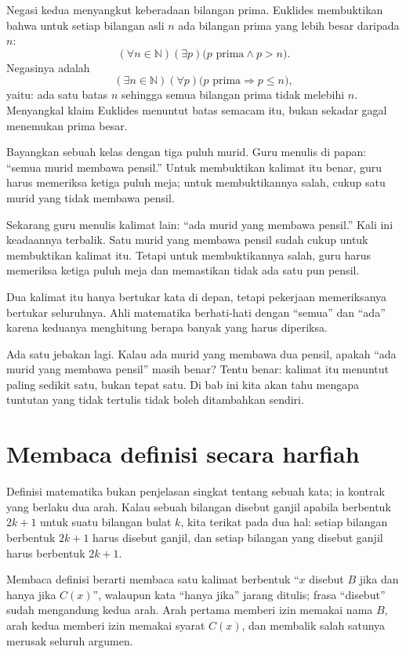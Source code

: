 Negasi kedua menyangkut keberadaan bilangan prima. Euklides membuktikan bahwa untuk
setiap bilangan asli $n$ ada bilangan prima yang lebih besar daripada $n$:
\[
  (\forall n \in \mathbb{N})(\exists p)\bigl(p \text{ prima} \wedge p > n\bigr).
\]
Negasinya adalah
\[
  (\exists n \in \mathbb{N})(\forall p)\bigl(p \text{ prima} \Rightarrow p \leq n\bigr),
\]
yaitu: ada satu batas $n$ sehingga semua bilangan prima tidak melebihi $n$. Menyangkal
klaim Euklides menuntut batas semacam itu, bukan sekadar gagal menemukan prima besar.

\begin{untukanak}
Bayangkan sebuah kelas dengan tiga puluh murid. Guru menulis di papan: ``semua murid
membawa pensil.'' Untuk membuktikan kalimat itu benar, guru harus memeriksa ketiga puluh meja; untuk
membuktikannya salah, cukup satu murid yang tidak membawa pensil.

Sekarang guru menulis kalimat lain: ``ada murid yang membawa pensil.'' Kali ini
keadaannya terbalik. Satu murid yang membawa pensil sudah cukup untuk membuktikan
kalimat itu. Tetapi untuk membuktikannya salah, guru harus memeriksa ketiga puluh meja
dan memastikan tidak ada satu pun pensil.

Dua kalimat itu hanya bertukar kata di depan, tetapi pekerjaan memeriksanya bertukar
seluruhnya. Ahli matematika berhati-hati dengan ``semua'' dan ``ada'' karena keduanya
menghitung berapa banyak yang harus diperiksa.

Ada satu jebakan lagi. Kalau ada murid yang membawa dua pensil, apakah ``ada murid yang
membawa pensil'' masih benar? Tentu benar: kalimat itu menuntut paling sedikit satu,
bukan tepat satu. Di bab ini kita akan tahu mengapa tuntutan yang tidak tertulis tidak
boleh ditambahkan sendiri.
\end{untukanak}

\section{Membaca definisi secara harfiah}

Definisi matematika bukan penjelasan singkat tentang sebuah kata; ia kontrak yang
berlaku dua arah. Kalau sebuah bilangan disebut ganjil apabila berbentuk $2k+1$ untuk
suatu bilangan bulat $k$, kita terikat pada dua hal: setiap bilangan berbentuk $2k+1$
harus disebut ganjil, dan setiap bilangan yang disebut ganjil harus berbentuk $2k+1$.

Membaca definisi berarti membaca satu kalimat berbentuk ``$x$ disebut $B$ jika dan hanya
jika $C(x)$'', walaupun kata ``hanya jika'' jarang ditulis; frasa ``disebut'' sudah
mengandung kedua arah. Arah pertama memberi izin memakai nama $B$, arah kedua memberi izin
memakai syarat $C(x)$, dan membalik salah satunya merusak seluruh argumen.


